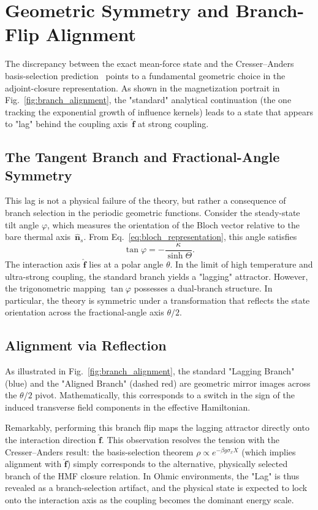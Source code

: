 \section{Geometric Symmetry and Branch-Flip Alignment}
\label{sec:branch_derivation}

The discrepancy between the exact mean-force state and the Cresser--Anders basis-selection prediction~\cite{Cresser2021} points to a fundamental geometric choice in the adjoint-closure representation. As shown in the magnetization portrait in Fig.~\ref{fig:branch_alignment}, the "standard" analytical continuation (the one tracking the exponential growth of influence kernels) leads to a state that appears to "lag" behind the coupling axis~$\hat{\mathbf{f}}$ at strong coupling. 

\subsection{The Tangent Branch and Fractional-Angle Symmetry}
This lag is not a physical failure of the theory, but rather a consequence of branch selection in the periodic geometric functions. Consider the steady-state tilt angle $\varphi$, which measures the orientation of the Bloch vector relative to the bare thermal axis~$\hat{\mathbf{n}}_s$. From Eq.~\eqref{eq:bloch_representation}, this angle satisfies
\begin{equation}
    \tan\varphi = - \frac{\kappa}{\sinh\Theta}.
\end{equation}
The interaction axis $\hat{\mathbf{f}}$ lies at a polar angle $\theta$. In the limit of high temperature and ultra-strong coupling, the standard branch yields a "lagging" attractor. However, the trigonometric mapping $\tan\varphi$ possesses a dual-branch structure. In particular, the theory is symmetric under a transformation that reflects the state orientation across the fractional-angle axis $\theta/2$.

\subsection{Alignment via Reflection}
As illustrated in Fig.~\ref{fig:branch_alignment}, the standard "Lagging Branch" (blue) and the "Aligned Branch" (dashed red) are geometric mirror images across the $\theta/2$ pivot. Mathematically, this corresponds to a switch in the sign of the induced transverse field components in the effective Hamiltonian. 

Remarkably, performing this branch flip maps the lagging attractor directly onto the interaction direction $\hat{\mathbf{f}}$. This observation resolves the tension with the Cresser--Anders result: the basis-selection theorem $\rho \propto e^{-\beta g \sigma_x X}$ (which implies alignment with $\hat{\mathbf{f}}$) simply corresponds to the alternative, physically selected branch of the HMF closure relation. In Ohmic environments, the "Lag" is thus revealed as a branch-selection artifact, and the physical state is expected to lock onto the interaction axis as the coupling becomes the dominant energy scale.

